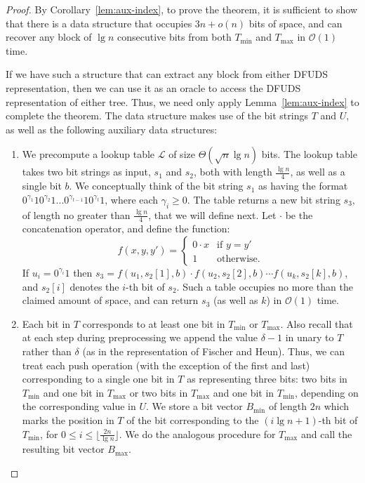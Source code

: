 \documentclass[runningheads]{llncs}
\newcommand{\Oh}{\mathcal{O}}
\begin{document}
\begin{proof}
By Corollary~\ref{lem:aux-index}, to prove the theorem, it is
sufficient to show that there is a data structure that occupies $3n +
o(n)$ bits of space, and can recover any block of $\lg n$ consecutive
bits from both $T_{\min}$ and $T_{\max}$ in $\Oh(1)$ time.

If we have such a structure that can extract any
block from either DFUDS representation, then we can use it as an
oracle to access the DFUDS representation of either tree.  Thus, we
need only apply Lemma~\ref{lem:aux-index} to complete the theorem.
The data structure makes use of the bit strings $T$ and $U$, as well
as the following auxiliary data structures:

\begin{enumerate}

\item We precompute a lookup table $\mathcal{L}$ of size
  $\Theta(\sqrt{n} \lg n)$ bits.  The lookup table takes two bit
  strings as input, $s_1$ and $s_2$, both with length $\frac{\lg
    n}{4}$, as well as a single bit $b$.  We conceptually think of the
  bit string $s_1$ as having the format
  $0^{\gamma_1}10^{\gamma_2}1...0^{\gamma_{t-1}}10^{\gamma_{t}}1$,
  where each $\gamma_i \ge 0$. The table returns a new bit string
  $s_3$, of length no greater than $\frac{\lg n}{4}$, that we will
  define next.  Let $\cdot$ be the concatenation operator, and define
  the function:
  $$f(x,y,y') = \begin{cases}0\cdot x & \text{if $y = y'$} \\ 1 &
    \text{otherwise.} \end{cases}$$ If $u_i = 0^{\gamma_i}1$ then $s_3
  = f(u_1,s_2[1],b)\cdot f(u_2,s_2[2],b) \cdots f(u_k,s_2[k],b)$, and
  $s_2[i]$ denotes the $i$-th bit of $s_2$.  Such a table occupies no
  more than the claimed amount of space, and can return $s_3$ (as well
  as $k$) in $\Oh(1)$ time.

\item Each bit in $T$ corresponds to at least one bit in $T_{\min}$ or
  $T_{\max}$.  Also recall that at each step during preprocessing we
  append the value $\delta-1$ in unary to $T$ rather than $\delta$ (as
  in the representation of Fischer and Heun).  Thus, we can treat each
  push operation (with the exception of the first and last)
  corresponding to a single one bit in $T$ as representing three bits:
  two bits in $T_{\min}$ and one bit in $T_{\max}$ or two bits in
  $T_{\max}$ and one bit in $T_{\min}$, depending on the corresponding
  value in $U$.  We store a bit vector $B_{\min}$ of length $2n$ which
  marks the position in $T$ of the bit corresponding to the $(i \lg n
  + 1)$-th bit of $T_{\min}$, for $0 \le i \le \lfloor \frac{2n}{\lg
    n}\rfloor$.  We do the analogous procedure for $T_{\max}$ and call
  the resulting bit vector $B_{\max}$.


\end{enumerate}
\end{proof}
\end{document}
